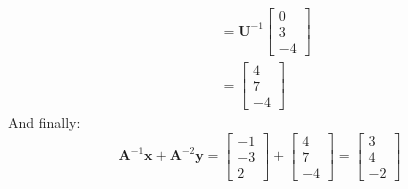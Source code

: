 \documentclass[]{article}
\newcommand{\A}{\bm{A}}					%
\newcommand{\bbm}{\begin{bmatrix}}		%
\newcommand{\ebm}{\end{bmatrix}}		%
\newcommand{\x}{\bm{x}}					%
\newcommand{\y}{\bm{y}}					%
\begin{document}
\begin{enumerate}
\[\begin{split}
      &= \bm{U}^{-1}\bbm 0\\3\\-4 \ebm \\
      &= \bbm 4\\7\\-4 \ebm
      \end{split}\]
      And finally:
      $$\A^{-1}\x + \A^{-2}\y = \bbm -1\\-3\\2 \ebm + \bbm 4\\7\\-4 \ebm = \bbm 3\\4\\-2 \ebm$$

    \end{enumerate}
\end{document}
